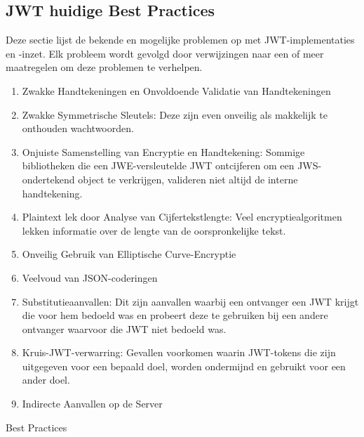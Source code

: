   \subsection{JWT huidige Best Practices}%
  \label{subsec:jwt-huidige-best-practices}
  Deze sectie lijst de bekende en mogelijke problemen op met JWT-implementaties en -inzet. Elk probleem wordt gevolgd door verwijzingen naar een of meer maatregelen om deze problemen te verhelpen.
  \begin{enumerate}[label=\textbf{-}]
      \item Zwakke Handtekeningen en Onvoldoende Validatie van Handtekeningen
      \item Zwakke Symmetrische Sleutels: Deze zijn even onveilig als makkelijk te onthouden wachtwoorden.
      \item Onjuiste Samenstelling van Encryptie en Handtekening: Sommige bibliotheken die een JWE-versleutelde JWT ontcijferen om een JWS-ondertekend object te verkrijgen, valideren niet altijd de interne handtekening.
      \item Plaintext lek door Analyse van Cijfertekstlengte: Veel encryptiealgoritmen lekken informatie over de lengte van de oorspronkelijke tekst.
      \item Onveilig Gebruik van Elliptische Curve-Encryptie
      \item Veelvoud van JSON-coderingen
      \item Substitutieaanvallen: Dit zijn aanvallen waarbij een ontvanger een JWT krijgt die voor hem bedoeld was en probeert deze te gebruiken bij een andere ontvanger waarvoor die JWT niet bedoeld was.
      \item Kruis-JWT-verwarring: Gevallen voorkomen waarin JWT-tokens die zijn uitgegeven voor een bepaald doel, worden ondermijnd en gebruikt voor een ander doel.
      \item Indirecte Aanvallen op de Server
  \end{enumerate}
  Best Practices
